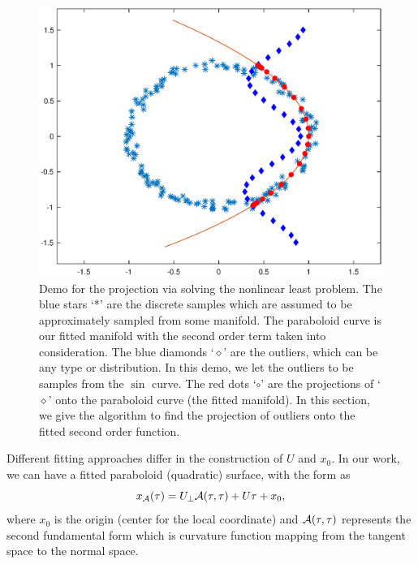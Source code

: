 \documentclass{article}
\theoremstyle{remark}
\begin{document}
\begin{figure}[h] %
   \centering
   \includegraphics[width=0.8\linewidth]{demo3.eps} 
   \vspace{-0.4cm}
   \caption{Demo for the projection via solving the nonlinear least problem. The blue stars `*' are the discrete samples which are assumed to be approximately sampled from some manifold. The paraboloid curve is our fitted manifold with the second order term taken into consideration. The blue diamonds `$\diamond$' are the outliers, which can be any type or distribution. In this demo, we let the outliers to be samples from the $\sin$ curve. The red dots `$\circ$' are the projections of `$\diamond$' onto the paraboloid curve (the fitted manifold). In this section, we give the algorithm to find the projection of outliers onto the fitted second order function.}
   \label{fig:demo}
\end{figure}



Different fitting approaches differ in the construction of $U$ and $x_0$.
In our work, we can have a fitted paraboloid (quadratic) surface, with the form as
\begin{equation}\label{manifold_representation}
x_{\cal A}(\tau) = U_{\perp} {\cal A} (\tau,\tau) + U \tau +x_0,
\end{equation}
where $x_0$ is the origin (center for the local coordinate) and ${\cal A} (\tau,\tau)$ represents the second fundamental form which is curvature function mapping from the tangent space to the normal space. 
\end{document}
